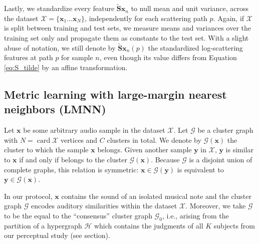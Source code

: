 \documentclass{bmcart}
\DeclareMathOperator*{\card}{card}
\newcommand{\lnameref}[1]{%
\bgroup
\let\nmu\MakeLowercase
\nameref{#1}\egroup}
\newcommand{\nmu}{}
\begin{document}
Lastly, we standardize every feature $\mathbf{\widetilde{S}}\boldsymbol{x}_n$ to null mean and unit variance, across the dataset $\mathcal{X} = \{\boldsymbol{x}_1 \ldots \boldsymbol{x}_N\}$, independently for each scattering path $p$.
Again, if $\mathcal{X}$ is split between training and test sets, we measure means and variances over the training set only and propagate them as constants to the test set.
With a slight abuse of notation, we still denote by $\mathbf{\widetilde{S}}\boldsymbol{x}_n (p)$ the standardized log-scattering features at path $p$ for sample $n$, even though its value differs from Equation \ref{eq:S_tilde} by an affine transformation.



\subsection*{Metric learning with large-margin nearest neighbors (LMNN)}
Let $\boldsymbol{x}$ be some arbitrary audio sample in the dataset $\mathcal{X}$.
Let $\mathcal{G}$ be a cluster graph with $N = \card \mathcal{X}$ vertices and $C$ clusters in total.
We denote by $\mathcal{G}(\boldsymbol{x})$ the cluster to which the sample $\boldsymbol{x}$ belongs.
Given another sample $\boldsymbol{y}$ in $\mathcal{X}$, $\boldsymbol{y}$ is similar to $\boldsymbol{x}$ if and only if belongs to the cluster $\mathcal{G}(\boldsymbol{x})$.
Because $\mathcal{G}$ is a disjoint union of complete graphs, this relation is symmetric: $\boldsymbol{x} \in \mathcal{G}(\boldsymbol{y})$ is equivalent to $\boldsymbol{y} \in \mathcal{G}(\boldsymbol{x})$.

In our protocol, $\boldsymbol{x}$ contains the sound of an isolated musical note and the cluster graph $\mathcal{G}$ encodes auditory similarities within the dataset $\mathcal{X}$.
Moreover, we take $\mathcal{G}$ to be the equal to the ``consensus'' cluster graph $\mathcal{G}_0$, i.e., arising from the partition of a hypergraph $\mathcal{H}$ which contains the judgments of all $K$ subjects from our perceptual study (see \lnameref{sec:data-collection} section).

\end{document}
